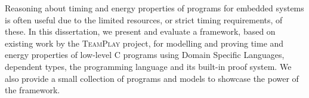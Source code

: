 Reasoning about timing and energy properties of programs for embedded systems is often useful due to the limited resources, or strict timing requirements, of these. In this dissertation, we present and evaluate a framework, based on existing work by the \textsc{TeamPlay} \cite{teamplay:d1.1} project, for modelling and proving time and energy properties of low-level C programs using Domain Specific Languages, dependent types, the \Idris programming language and its built-in proof system. We also provide a small collection of programs and models to showcase the power of the framework.
